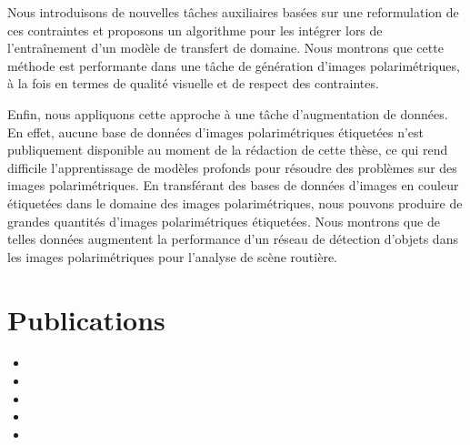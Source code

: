 {Nous introduisons de nouvelles tâches auxiliaires basées sur une reformulation de ces contraintes et proposons un algorithme pour les intégrer lors de l'entraînement d'un modèle de transfert de domaine. Nous montrons que cette méthode est performante dans une tâche de génération d'images polarimétriques, à la fois en termes de qualité visuelle et de respect des contraintes.

Enfin, nous appliquons cette approche à une tâche d'augmentation de données. En effet, aucune base de données d'images polarimétriques étiquetées n'est publiquement disponible au moment de la rédaction de cette thèse, ce qui rend difficile l'apprentissage de modèles profonds pour résoudre des problèmes sur des images polarimétriques. En transférant des bases de données d'images en couleur étiquetées dans le domaine des images polarimétriques, nous pouvons produire de grandes quantités d'images polarimétriques étiquetées. Nous montrons que de telles données augmentent la performance d'un réseau de détection d'objets dans les images polarimétriques pour l'analyse de scène routière.

\section*{Publications}

}

\begin{itemize}
	\item{}
	\item{}
	\item{}
	\item{}
	\item{}
\end{itemize}


\fancyhead[R]{}